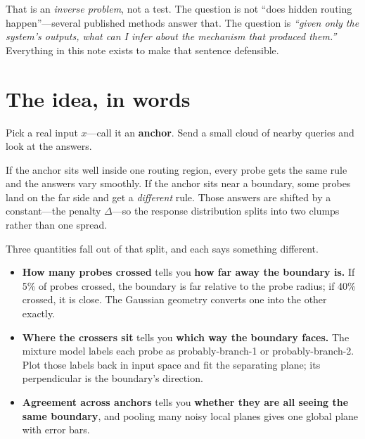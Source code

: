 \documentclass[11pt]{article}
\begin{document}
\noindent That is an \emph{inverse problem}, not a test. The question is not ``does hidden
routing happen''---several published methods answer that. The question is \emph{``given only the
system's outputs, what can I infer about the mechanism that produced them.''} Everything in this
note exists to make that sentence defensible.

\section{The idea, in words}
\label{sec:idea}

Pick a real input $x$---call it an \textbf{anchor}. Send a small cloud of nearby queries and look
at the answers.

If the anchor sits well inside one routing region, every probe gets the same rule and the answers
vary smoothly. If the anchor sits near a boundary, some probes land on the far side and get a
\emph{different} rule. Those answers are shifted by a constant---the penalty $\Delta$---so the
response distribution splits into two clumps rather than one spread.

Three quantities fall out of that split, and each says something different.

\begin{itemize}
\item \textbf{How many probes crossed} tells you \textbf{how far away the boundary is.} If 5\% of
probes crossed, the boundary is far relative to the probe radius; if 40\% crossed, it is close.
The Gaussian geometry converts one into the other exactly.
\item \textbf{Where the crossers sit} tells you \textbf{which way the boundary faces.} The mixture
model labels each probe as probably-branch-1 or probably-branch-2. Plot those labels back in input
space and fit the separating plane; its perpendicular is the boundary's direction.
\item \textbf{Agreement across anchors} tells you \textbf{whether they are all seeing the same
boundary}, and pooling many noisy local planes gives one global plane with error bars.
\end{itemize}
\end{document}
